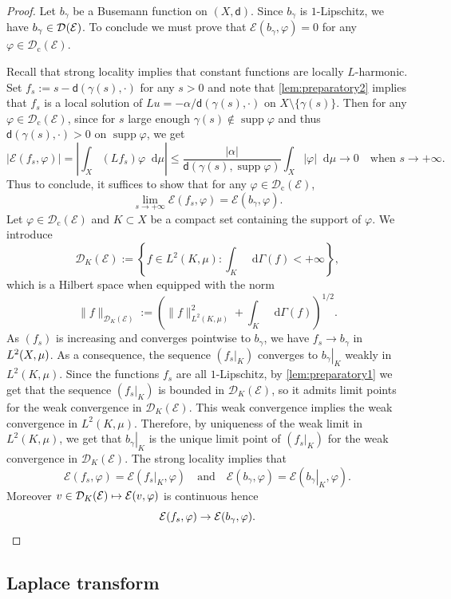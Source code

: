 \documentclass[JEP,XML,SOM,Unicode,published]{cedram}
\newcommand\mto{\mathchoice{\longmapsto}{\mapsto}{\mapsto}{\mapsto}}
\newcommand{\rmc}{\mathrm{c}}
\let\backslash\setminus
\newcommand{\NoChangel}[1]{%
\expandafter\let\csname old\string#1\endcsname=#1
\let#1=\relax
\newcommand{#1}{\mathcode`l="716C\csname old\string#1\endcsname\mathcode`l="7160 }%
}
\theoremstyle{plain}
\theoremstyle{definition}
\newcommand{\cE}{\mathcal{E}}
\newcommand{\cD}{\mathcal{D}}
\let\phi\varphi
\newcommand{\di}{\mathop{}\!\mathrm{d}}
\newcommand{\loc}{\mathrm{loc}}\NoChangel{\loc}
\DeclareMathOperator{\supp}{supp}
\newcommand{\dist}{\mathsf{d}}
\begin{document}
\begin{proof}
Let $b_\gamma$ be a Busemann function on $(X,\dist)$. Since $b_\gamma$ is $1$-Lipschitz, we have $b_\gamma \in \cD_{\loc}(\cE)$. To conclude we must prove that $\cE(b_\gamma,\phi)=0$ for any $\phi \in \cD_\rmc(\cE)$.

Recall that strong locality implies that constant functions are locally $L$-harmonic. Set $f_s:=s-\dist(\gamma(s),\cdot)$ for any $s>0$ and note that \eqref{lem:preparatory2} implies that $f_s$ is a local solution of $Lu = -\alpha/\dist(\gamma(s),\cdot)$ on $X \backslash \{\gamma(s)\}$. Then for any $\phi \in \cD_\rmc(\cE)$, since for $s$ large enough $\gamma(s) \notin \supp \phi$ and thus $\dist(\gamma(s),\cdot)>0$ on $\supp \phi$, we get
\[
|\cE(f_s,\phi)|= \left|\int_X (Lf_s) \phi \di \mu\right| \le \frac{|\alpha|}{\dist(\gamma(s),\supp \phi)} \int_X |\phi| \di \mu \to 0 \quad \text{when $s \to +\infty$}.
\]
Thus to conclude, it suffices to show that for any $\phi \in \cD_\rmc(\cE)$,
\[
\lim_{s \to +\infty} \cE(f_s,\phi)=\cE(b_\gamma,\phi).
\]
Let $\phi \in \cD_\rmc(\cE)$ and $K\subset X$ be a compact set containing the support of $\varphi$.
We introduce
\[
\cD_{K}(\cE):=\left\{ f \in L^2(K,\mu): \int_{K}\di \Gamma(f)<+\infty \right\},
\]
which is a Hilbert space when equipped with the norm
\[
\|f\|_{\cD_{K}(\cE)}:=\left(\|f\|^2_{L^2(K,\mu)} + \int_{K}\di \Gamma(f)\right)^{1/2}.
\]
As $(f_s)$ is increasing and converges pointwise to $b_\gamma$, we have $f_s \to b_\gamma$ in $L^2_{\loc}(X,\mu)$. As a consequence, the sequence $(\left.f_s\right|_K)$ converges to $\left.b_\gamma\right|_K$ weakly in $L^2(K,\mu)$. Since the functions $f_s$ are all $1$-Lipschitz, by \eqref{lem:preparatory1} we get that the sequence $(\left.f_s\right|_K)$ is bounded in $\cD_{K}(\cE)$, so it admits limit points for the weak convergence in $\cD_{K}(\cE)$. This weak convergence implies the weak convergence in $L^2(K,\mu)$. Therefore, by uniqueness of the weak limit in $L^2(K,\mu)$, we get that $\left.b_\gamma\right|_K$ is the unique limit point of $(\left.f_s\right|_K)$ for the weak convergence in $\cD_{K}(\cE)$. The strong locality implies that
\[
\cE(f_s,\phi)=\cE(\left.f_s\right|_K,\phi)\quad\text{and}\quad \cE(b_\gamma,\phi)=\cE(\left.b_\gamma\right|_K,\phi).
\]
Moreover $v\in \cD_{K}(\cE)\mto \cE(v,\phi)$ is continuous hence
\[
\cE(f_s,\phi)\to \cE(b_\gamma,\phi).\qedhere
\]
\end{proof}

\subsection*{Laplace transform}
\end{document}
